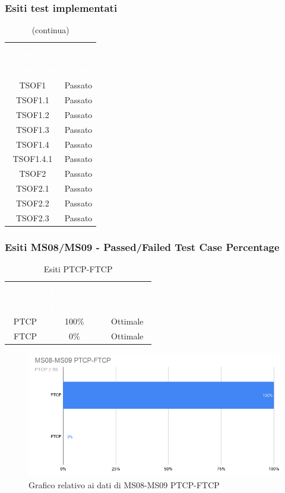 \subsubsection{Esiti test implementati}
\begin{longtable}{c c}
\rowcolor{white}\caption{Esiti dei test implementati} \\
	\rowcolor{redafk}
\textcolor{white}{\textbf{Codice test}} &
\textcolor{white}{\textbf{Esito}} \\
	\endfirsthead
		\rowcolor{white}\caption[]{(continua)} \\
		\rowcolor{redafk}
\textcolor{white}{\textbf{Codice test}} &
\textcolor{white}{\textbf{Esito}} \\
	\endhead
	TSOF1 & Passato \\
	TSOF1.1 & Passato \\ 
	TSOF1.2 & Passato \\
	TSOF1.3 & Passato \\
	TSOF1.4 & Passato \\
	TSOF1.4.1 & Passato \\
	TSOF2 & Passato \\
	TSOF2.1 & Passato \\
	TSOF2.2 & Passato \\
	TSOF2.3 & Passato
\end{longtable}

\subsubsection{Esiti MS08/MS09 - Passed/Failed Test Case Percentage}
\begin{longtable}{c c c}
\rowcolor{white}\caption{Esiti PTCP-FTCP} \\
	\rowcolor{redafk}
\textcolor{white}{\textbf{Metrica}} &
\textcolor{white}{\textbf{Percentuale}} & 
\textcolor{white}{\textbf{Riscontro}} \\
	\endfirsthead
\textcolor{white}{\textbf{Metrica}} &
\textcolor{white}{\textbf{Percentuale}} & 
\textcolor{white}{\textbf{Riscontro}} \\
	\endhead
	PTCP & 100\% & Ottimale\\
	FTCP & 0\% & Ottimale\\
\end{longtable}

\begin{figure}[H]
\centering
\includegraphics[scale=0.5]{./img/MS08-MS09.png}
\caption{Grafico relativo ai dati di MS08-MS09 PTCP-FTCP}
\end{figure}

